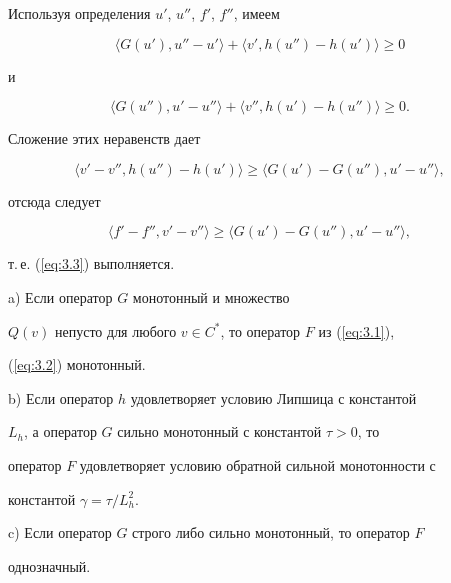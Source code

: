 \begin{pf}


Используя определения $u'$, $u''$, $f'$, $f''$, имеем


$$


\langle G(u'), u'' - u' \rangle+\langle v', h(u'') - h(u') \rangle \geq 0


$$


и


$$


\langle G(u''), u' - u'' \rangle+\langle v'', h(u') - h(u'') \rangle \geq 0.


$$


Сложение этих неравенств дает


$$


\langle v' - v'', h(u'') - h(u') \rangle \geq


\langle G(u') - G(u''), u' - u'' \rangle ,


$$


отсюда следует


$$


\langle f' - f'', v' - v'' \rangle \geq


\langle G(u') - G(u''), u' - u'' \rangle,


$$


т.\,е. (\ref{eq:3.3}) выполняется.


\end{pf}





\begin{cor} \label{cor:3.1}


a) Если оператор $G$ монотонный и множество 


$Q(v)$ непусто для любого $v \in C^*$, то оператор $F$ из (\ref{eq:3.1}), 


(\ref{eq:3.2}) монотонный.





b) Если оператор $h$ удовлетворяет условию Липшица с константой 


$L_{h}$, а оператор $G$ сильно монотонный с константой $\tau > 0$, то 


оператор $F$ удовлетворяет условию обратной сильной монотонности с 


константой $\gamma=\tau / L^2_{h}$.





c) Если оператор $G$ строго либо сильно монотонный, то оператор $F$ 


однозначный.


\end{cor}





